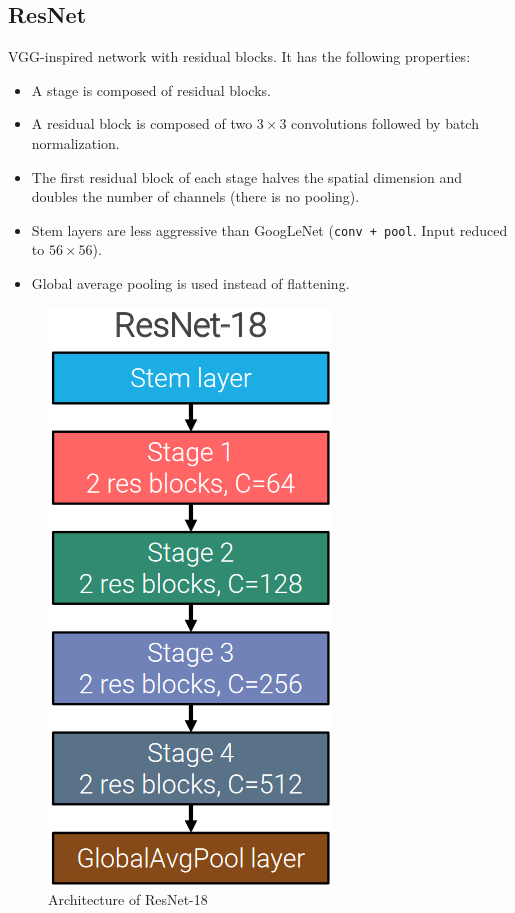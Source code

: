 \subsection{ResNet}

VGG-inspired network with residual blocks.
It has the following properties:
\begin{itemize}
    \item A stage is composed of residual blocks.
    \item A residual block is composed of two $3 \times 3$ convolutions followed by batch normalization.
    \item The first residual block of each stage halves the spatial dimension and doubles the number of channels (there is no pooling).
    \item Stem layers are less aggressive than GoogLeNet (\texttt{conv + pool}. Input reduced to $56 \times 56$).
    \item Global average pooling is used instead of flattening.
\end{itemize}

\begin{figure}[H]
    \centering
    \includegraphics[width=0.15\linewidth]{./img/resnet_18.png}
    \caption{Architecture of ResNet-18}
\end{figure}

